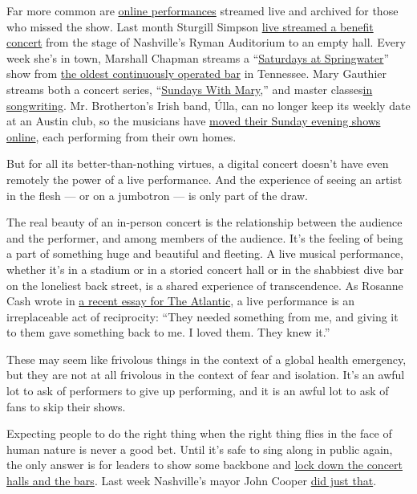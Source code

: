 Far more common are
\href{https://www.vulture.com/2020/05/all-musicians-streaming-live-concerts.html}{online
performances} streamed live and archived for those who missed the show.
Last month Sturgill Simpson
\href{https://www.nashvillescene.com/music/spin/article/21136475/sturgill-simpson-lets-the-grass-grow-at-the-ryman}{live
streamed a benefit concert} from the stage of Nashville's Ryman
Auditorium to an empty hall. Every week she's in town, Marshall Chapman
streams a
``\href{https://www.facebookcorewwwi.onion/pg/marshallchapmanmusic/events/}{Saturdays
at Springwater}'' show from \href{https://www.thespringwater.com/}{the
oldest continuously operated bar} in Tennessee. Mary Gauthier streams
both a concert series,
``\href{https://www.marygauthier.com/tour}{Sundays With Mary},'' and
master classes\href{https://www.marygauthier.com/masterclass}{in
songwriting}. Mr. Brotherton's Irish band, Úlla, can no longer keep its
weekly date at an Austin club, so the musicians have
\href{https://www.facebookcorewwwi.onion/pg/ullairishmusic/posts/?ref=page_internal}{moved
their Sunday evening shows online}, each performing from their own
homes.

But for all its better-than-nothing virtues, a digital concert doesn't
have even remotely the power of a live performance. And the experience
of seeing an artist in the flesh --- or on a jumbotron --- is only part
of the draw.

The real beauty of an in-person concert is the relationship between the
audience and the performer, and among members of the audience. It's the
feeling of being a part of something huge and beautiful and fleeting. A
live musical performance, whether it's in a stadium or in a storied
concert hall or in the shabbiest dive bar on the loneliest back street,
is a shared experience of transcendence. As Rosanne Cash wrote in
\href{https://www.theatlantic.com/ideas/archive/2020/05/what-pandemic-has-clarified-me-about-life-road/612076/}{a
recent essay for The Atlantic}, a live performance is an irreplaceable
act of reciprocity: ``They needed something from me, and giving it to
them gave something back to me. I loved them. They knew it.''

These may seem like frivolous things in the context of a global health
emergency, but they are not at all frivolous in the context of fear and
isolation. It's an awful lot to ask of performers to give up performing,
and it is an awful lot to ask of fans to skip their shows.

Expecting people to do the right thing when the right thing flies in the
face of human nature is never a good bet. Until it's safe to sing along
in public again, the only answer is for leaders to show some backbone
and
\href{https://www.nytimes3xbfgragh.onion/aponline/2020/07/02/health/bc-us-med-virus-outbreak-bars.html?searchResultPosition=2}{lock
down the concert halls and the bars}. Last week Nashville's mayor John
Cooper
\href{https://wpln.org/post/nashville-backtracks-on-reopening-plan-reverting-to-phase-2/}{did
just that}.

